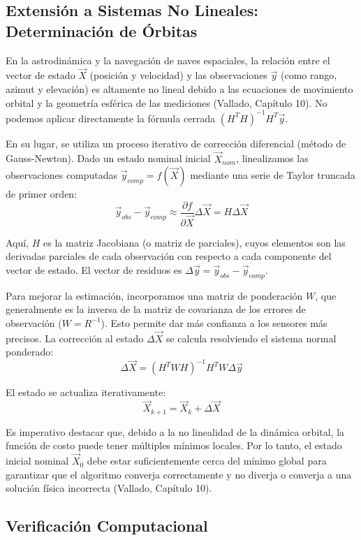\subsection{Extensión a Sistemas No Lineales: Determinación de Órbitas}

En la astrodinámica y la navegación de naves espaciales, la relación entre el vector de estado $\vec{X}$ (posición y velocidad) y las observaciones $\vec{y}$ (como rango, azimut y elevación) es altamente no lineal debido a las ecuaciones de movimiento orbital y la geometría esférica de las mediciones (Vallado, Capítulo 10). No podemos aplicar directamente la fórmula cerrada $(H^T H)^{-1} H^T \vec{y}$.

En su lugar, se utiliza un proceso iterativo de corrección diferencial (método de Gauss-Newton). Dado un estado nominal inicial $\vec{X}_{nom}$, linealizamos las observaciones computadas $\vec{y}_{comp} = f(\vec{X})$ mediante una serie de Taylor truncada de primer orden:
$$ \vec{y}_{obs} - \vec{y}_{comp} \approx \frac{\partial f}{\partial \vec{X}} \Delta \vec{X} = H \Delta \vec{X} $$

Aquí, $H$ es la matriz Jacobiana (o matriz de parciales), cuyos elementos son las derivadas parciales de cada observación con respecto a cada componente del vector de estado. El vector de residuos es $\Delta \vec{y} = \vec{y}_{obs} - \vec{y}_{comp}$.

Para mejorar la estimación, incorporamos una matriz de ponderación $W$, que generalmente es la inversa de la matriz de covarianza de los errores de observación ($W = R^{-1}$). Esto permite dar más confianza a los sensores más precisos. La corrección al estado $\Delta \vec{X}$ se calcula resolviendo el sistema normal ponderado:
$$ \Delta \vec{X} = (H^T W H)^{-1} H^T W \Delta \vec{y} $$

El estado se actualiza iterativamente:
$$ \vec{X}_{k+1} = \vec{X}_k + \Delta \vec{X} $$

Es imperativo destacar que, debido a la no linealidad de la dinámica orbital, la función de costo puede tener múltiples mínimos locales. Por lo tanto, el estado inicial nominal $\vec{X}_0$ debe estar suficientemente cerca del mínimo global para garantizar que el algoritmo converja correctamente y no diverja o converja a una solución física incorrecta (Vallado, Capítulo 10).

\subsection{Verificación Computacional}

